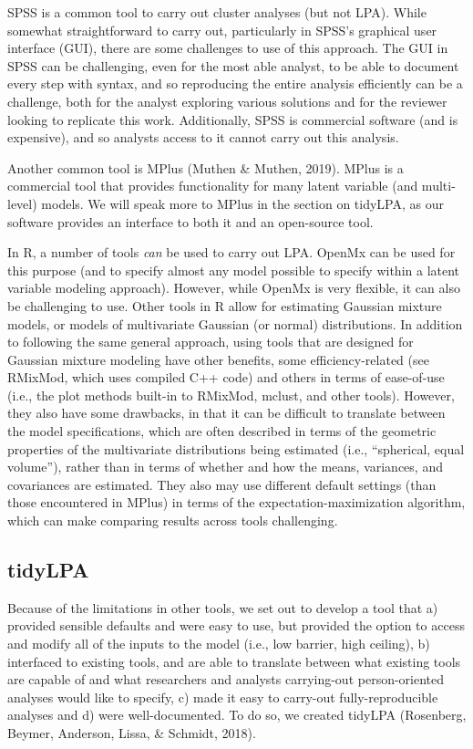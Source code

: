 \documentclass[
  english,
  man]{apa6}
\begin{document}
SPSS is a common tool to carry out cluster analyses (but not LPA). While
somewhat straightforward to carry out, particularly in SPSS's graphical user
interface (GUI), there are some challenges to use of this approach. The GUI in
SPSS can be challenging, even for the most able analyst, to be able to document
every step with syntax, and so reproducing the entire analysis efficiently can
be a challenge, both for the analyst exploring various solutions and for the
reviewer looking to replicate this work. Additionally, SPSS is commercial
software (and is expensive), and so analysts access to it cannot carry out this
analysis.

Another common tool is MPlus (Muthen \& Muthen, 2019). MPlus is a commercial tool
that provides functionality for many latent variable (and multi-level) models.
We will speak more to MPlus in the section on tidyLPA, as our software provides
an interface to both it and an open-source tool.

In R, a number of tools \emph{can} be used to carry out LPA. OpenMx can be used for
this purpose (and to specify almost any model possible to specify within a
latent variable modeling approach). However, while OpenMx is very flexible, it
can also be challenging to use. Other tools in R allow for estimating Gaussian
mixture models, or models of multivariate Gaussian (or normal) distributions. In
addition to following the same general approach, using tools that are designed
for Gaussian mixture modeling have other benefits, some efficiency-related (see
RMixMod, which uses compiled C++ code) and others in terms of ease-of-use (i.e.,
the plot methods built-in to RMixMod, mclust, and other tools). However, they
also have some drawbacks, in that it can be difficult to translate between the
model specifications, which are often described in terms of the geometric
properties of the multivariate distributions being estimated (i.e., \enquote{spherical,
equal volume}), rather than in terms of whether and how the means, variances,
and covariances are estimated. They also may use different default settings
(than those encountered in MPlus) in terms of the expectation-maximization
algorithm, which can make comparing results across tools challenging.

\hypertarget{tidylpa}{%
\subsection{tidyLPA}\label{tidylpa}}

Because of the limitations in other tools, we set out to develop a tool that a)
provided sensible defaults and were easy to use, but provided the option to
access and modify all of the inputs to the model (i.e., low barrier, high
ceiling), b) interfaced to existing tools, and are able to translate between
what existing tools are capable of and what researchers and analysts
carrying-out person-oriented analyses would like to specify, c) made it easy to
carry-out fully-reproducible analyses and d) were well-documented. To do so, we
created tidyLPA (Rosenberg, Beymer, Anderson, Lissa, \& Schmidt, 2018).
\end{document}
